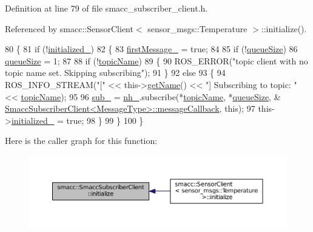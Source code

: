 Definition at line 79 of file smacc\+\_\+subscriber\+\_\+client.\+h.



Referenced by smacc\+::\+Sensor\+Client$<$ sensor\+\_\+msgs\+::\+Temperature $>$\+::initialize().


\begin{DoxyCode}
80   \{
81     \textcolor{keywordflow}{if} (!\hyperlink{classsmacc_1_1SmaccSubscriberClient_a429baac945d15cb7d997c41c847f5c33}{initialized\_})
82     \{
83       \hyperlink{classsmacc_1_1SmaccSubscriberClient_ad7af631a0b6bdacb76a2532a06ad0a03}{firstMessage\_} = \textcolor{keyword}{true};
84 
85       \textcolor{keywordflow}{if} (!\hyperlink{classsmacc_1_1SmaccSubscriberClient_ac8d4905509ecacb7c93d72c9acb9b6a1}{queueSize})
86         \hyperlink{classsmacc_1_1SmaccSubscriberClient_ac8d4905509ecacb7c93d72c9acb9b6a1}{queueSize} = 1;
87 
88       \textcolor{keywordflow}{if} (!\hyperlink{classsmacc_1_1SmaccSubscriberClient_ac062907e834aa8e4ca7964fe2035edf7}{topicName})
89       \{
90         ROS\_ERROR(\textcolor{stringliteral}{"topic client with no topic name set. Skipping subscribing"});
91       \}
92       \textcolor{keywordflow}{else}
93       \{
94         ROS\_INFO\_STREAM(\textcolor{stringliteral}{"["} << this->\hyperlink{classsmacc_1_1ISmaccClient_a20846aabfd1de832aa27d7a8237a1742}{getName}() << \textcolor{stringliteral}{"] Subscribing to topic: "} << 
      \hyperlink{classsmacc_1_1SmaccSubscriberClient_ac062907e834aa8e4ca7964fe2035edf7}{topicName});
95 
96         \hyperlink{classsmacc_1_1SmaccSubscriberClient_a2a1c46e0ea0a2090a63232402b998518}{sub\_} = \hyperlink{classsmacc_1_1SmaccSubscriberClient_addb62aabc4f81ddac5a151642335ab54}{nh\_}.subscribe(*\hyperlink{classsmacc_1_1SmaccSubscriberClient_ac062907e834aa8e4ca7964fe2035edf7}{topicName}, *\hyperlink{classsmacc_1_1SmaccSubscriberClient_ac8d4905509ecacb7c93d72c9acb9b6a1}{queueSize}, &
      \hyperlink{classsmacc_1_1SmaccSubscriberClient_a4102c06930ea8c7ab3d8c5ed9621ce4e}{SmaccSubscriberClient<MessageType>::messageCallback}, \textcolor{keyword}{
      this});
97         this->\hyperlink{classsmacc_1_1SmaccSubscriberClient_a429baac945d15cb7d997c41c847f5c33}{initialized\_} = \textcolor{keyword}{true};
98       \}
99     \}
100   \}
\end{DoxyCode}


Here is the caller graph for this function\+:
\nopagebreak
\begin{figure}[H]
\begin{center}
\leavevmode
\includegraphics[width=350pt]{classsmacc_1_1SmaccSubscriberClient_acfa97685ecc588fe61eb57002354b58a_icgraph}
\end{center}
\end{figure}


